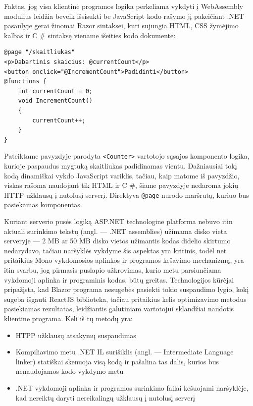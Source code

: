 \documentclass{VUMIFPSkursinis}
\begin{document}
Faktas, jog visa klientinė programos logika perkeliama vykdyti į WebAssembly modulius leidžia beveik išsisukti be JavaScript kodo rašymo jį pakeičiant .NET pasaulyje gerai žinomai Razor sintaksei, kuri sujungia HTML, CSS žymėjimo kalbas ir C \# sintaksę viename išeities kodo dokumente:

\begin{center}
\begin{small}
\begin{verbatim}
@page "/skaitliukas"
<p>Dabartinis skaicius: @currentCount</p>
<button onclick="@IncrementCount">Padidinti</button>
@functions {
    int currentCount = 0;
    void IncrementCount()
    {
        currentCount++;
    }
}
\end{verbatim}
\end{small}
\end{center}

Pateiktame pavyzdyje parodyta \verb|<Counter>| vartotojo sąsajos komponento logika, kurioje paspaudus mygtuką skaitliukas padidinamas vientu. Dažniausiai tokį kodą dinamiškai vykdo JavaScript variklis, tačiau, kaip matome iš pavyzdžio, viskas rašoma naudojant tik HTML ir C \#, šiame pavyzdyje nedaroma jokių HTTP užklausų į nutolusį serverį. Direktyva \verb|@page| nurodo maršrutą, kuriuo bus pasiekamas komponentas.

Kuriant serverio pusės logiką ASP.NET technologine platforma nebuvo itin aktuali surinkimo tekstų (angl. — .NET assemblies) užimama disko vieta serveryje — 2 MB ar 50 MB disko vietos užimantis kodas didelio skirtumo nedarydavo, tačiau naršyklės vykdyme šis aspektas yra kritinis, todėl net pritaikius Mono vykdomosios aplinkos ir programos kešavimo mechanizmą, yra itin svarbu, jog pirmasis puslapio užkrovimas, kurio metu parsiunčiama vykdomoji aplinka ir programinis kodas, būtų greitas. Technologijos kūrėjai pripažįsta, kad Blazor programa nesugebės pasiekti tokio suspaudimo lygio, kokį sugeba išgauti ReactJS biblioteka, tačiau pritaikius kelis optimizavimo metodus pasiekiamas rezultatas, leidžiantis galutiniam vartotojui sklandžiai naudotis klientine programa. Keli iš tų metodų yra:
\begin{itemize}
    \item HTPP užklausų atsakymų suspaudimas
    \item Kompiliavimo metu .NET IL surišiklis (angl. — Intermediate Language linker) statiškai skenuoja visą kodą ir pašalina tas dalis, kurios bus nenaudojamos kodo vykdymo metu
    \item .NET vykdomoji aplinka ir programos surinkimo failai kešuojami naršyklėje, kad nereiktų daryti nereikalingų užklausų į nutolusį serverį
\end{itemize}
\end{document}
